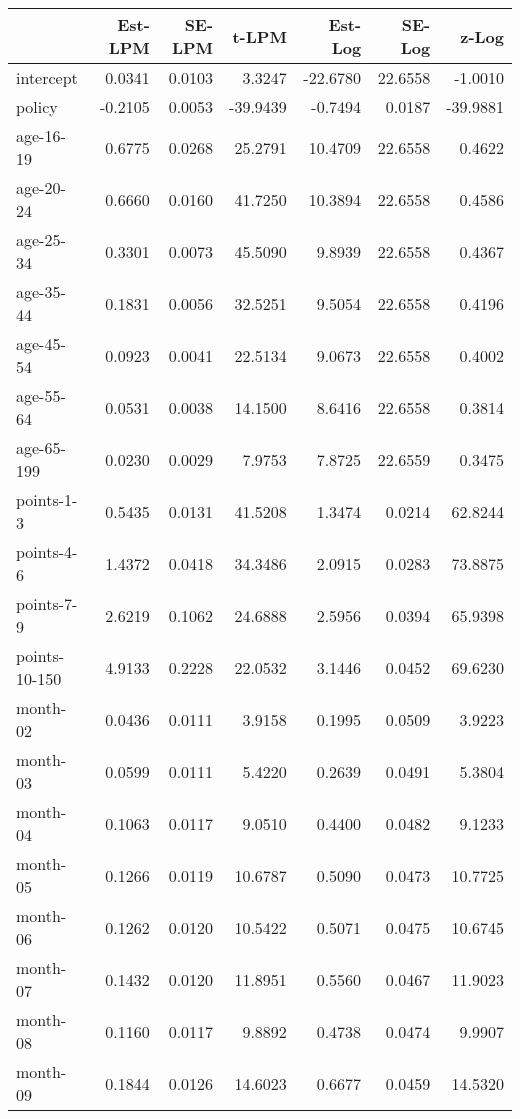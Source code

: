 \documentclass[10pt]{article}
\begin{document}
\begin{table}[ht]
\centering
\begin{tabular}{lrrrrrr}
  \hline
 & Est-LPM & SE-LPM & t-LPM & Est-Log & SE-Log & z-Log \\ 
  \hline
intercept & 0.0341 & 0.0103 & 3.3247 & -22.6780 & 22.6558 & -1.0010 \\ 
  policy & -0.2105 & 0.0053 & -39.9439 & -0.7494 & 0.0187 & -39.9881 \\ 
  age-16-19 & 0.6775 & 0.0268 & 25.2791 & 10.4709 & 22.6558 & 0.4622 \\ 
  age-20-24 & 0.6660 & 0.0160 & 41.7250 & 10.3894 & 22.6558 & 0.4586 \\ 
  age-25-34 & 0.3301 & 0.0073 & 45.5090 & 9.8939 & 22.6558 & 0.4367 \\ 
  age-35-44 & 0.1831 & 0.0056 & 32.5251 & 9.5054 & 22.6558 & 0.4196 \\ 
  age-45-54 & 0.0923 & 0.0041 & 22.5134 & 9.0673 & 22.6558 & 0.4002 \\ 
  age-55-64 & 0.0531 & 0.0038 & 14.1500 & 8.6416 & 22.6558 & 0.3814 \\ 
  age-65-199 & 0.0230 & 0.0029 & 7.9753 & 7.8725 & 22.6559 & 0.3475 \\ 
  points-1-3 & 0.5435 & 0.0131 & 41.5208 & 1.3474 & 0.0214 & 62.8244 \\ 
  points-4-6 & 1.4372 & 0.0418 & 34.3486 & 2.0915 & 0.0283 & 73.8875 \\ 
  points-7-9 & 2.6219 & 0.1062 & 24.6888 & 2.5956 & 0.0394 & 65.9398 \\ 
  points-10-150 & 4.9133 & 0.2228 & 22.0532 & 3.1446 & 0.0452 & 69.6230 \\ 
  month-02 & 0.0436 & 0.0111 & 3.9158 & 0.1995 & 0.0509 & 3.9223 \\ 
  month-03 & 0.0599 & 0.0111 & 5.4220 & 0.2639 & 0.0491 & 5.3804 \\ 
  month-04 & 0.1063 & 0.0117 & 9.0510 & 0.4400 & 0.0482 & 9.1233 \\ 
  month-05 & 0.1266 & 0.0119 & 10.6787 & 0.5090 & 0.0473 & 10.7725 \\ 
  month-06 & 0.1262 & 0.0120 & 10.5422 & 0.5071 & 0.0475 & 10.6745 \\ 
  month-07 & 0.1432 & 0.0120 & 11.8951 & 0.5560 & 0.0467 & 11.9023 \\ 
  month-08 & 0.1160 & 0.0117 & 9.8892 & 0.4738 & 0.0474 & 9.9907 \\ 
  month-09 & 0.1844 & 0.0126 & 14.6023 & 0.6677 & 0.0459 & 14.5320 \\ 

\end{tabular}
\end{table}
\end{document}
